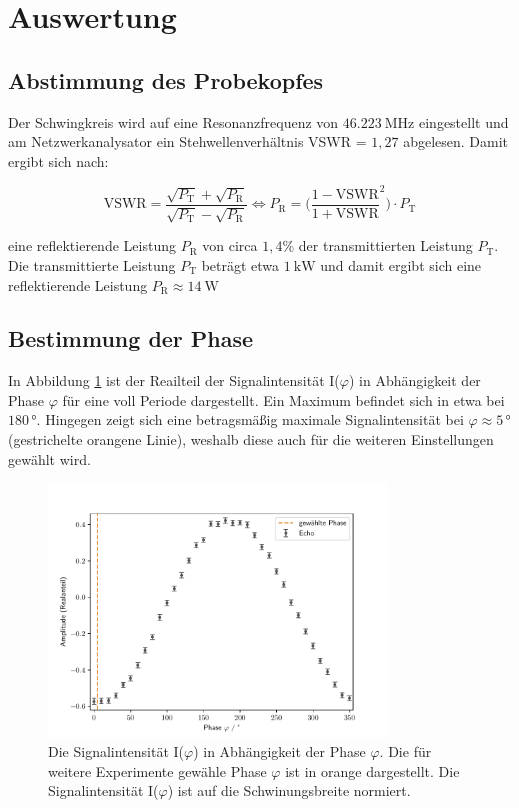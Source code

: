 \section{Auswertung}
\label{sec:Auswertung}

\subsection{Abstimmung des Probekopfes}
\label{sec:Abstimmung}
Der Schwingkreis wird auf eine Resonanzfrequenz von $\SI{46,223}{\mega\hertz}$
eingestellt und am Netzwerkanalysator ein Stehwellenverhältnis VSWR =
$\si{1,27}$ abgelesen. Damit ergibt sich nach:

\begin{equation}
    \text{VSWR} = \frac{\sqrt{P_{\text{T}}} + \sqrt{P_{\text{R}}}}
                {\sqrt{P_{\text{T}}} - \sqrt{P_{\text{R}}}}
    \iff
    P_{\text{R}} = \biggl( \frac{1-\text{VSWR}}{1+\text{VSWR}}^2 \biggr) \cdot P_{\text{T}}
\end{equation}

\noindent
eine reflektierende Leistung $P_{\text{R}}$ von circa $1,4\%$ der transmittierten
Leistung $P_{\text{T}}$. Die transmittierte Leistung $P_{\text{T}}$ beträgt etwa
$\SI{1}{\kilo\watt}$ und damit ergibt sich eine reflektierende Leistung
$P_{\text{R}} \approx \SI{14}{\watt}$

\subsection{Bestimmung der Phase}
\label{sec:phase}
In Abbildung \ref{fig:phase} ist der Reailteil der Signalintensität I($\varphi$) in Abhängigkeit
der Phase $\varphi$ für eine voll Periode dargestellt. Ein Maximum befindet sich
in etwa bei $180\,°$. Hingegen zeigt sich eine betragsmäßig maximale Signalintensität
bei $\varphi\approx 5\,°$ (gestrichelte orangene Linie), weshalb diese
auch für die weiteren Einstellungen gewählt wird.

\begin{figure}[H]
    \centering
    \includegraphics[width=0.8\textwidth]{Auswertung/winkel.pdf}
    \caption{Die Signalintensität I($\varphi$) in Abhängigkeit der Phase $\varphi$.
    Die für weitere Experimente gewähle Phase $\varphi$ ist in orange dargestellt.
    Die Signalintensität I($\varphi$) ist auf die Schwinungsbreite normiert.}
    \label{fig:phase}
\end{figure}

